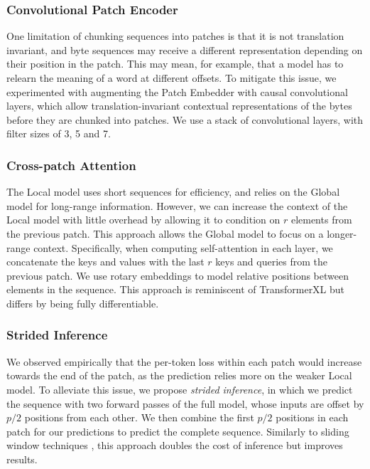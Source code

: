 \documentclass{article}
\theoremstyle{plain}
\theoremstyle{definition}
\theoremstyle{remark}
\begin{document}
\subsubsection{Convolutional Patch Encoder}

One limitation of chunking sequences into patches is that it is not translation invariant, and byte sequences may receive a different representation depending on their position in the patch. This may mean, for example, that a model has to relearn the meaning of a word at different offsets. To mitigate this issue, we experimented with augmenting the Patch Embedder with causal convolutional layers, which allow translation-invariant contextual representations of the bytes before they are chunked into patches. We use a stack of convolutional layers, with filter sizes of 3, 5 and 7. %

\subsubsection{Cross-patch Attention}
The Local model uses short sequences for efficiency, and relies on the Global model for long-range information. However, we can increase the context of the Local model with little overhead by allowing it to condition on $r$ elements from the previous patch. This approach allows the Global model to focus on a longer-range context. Specifically, when computing self-attention in each layer, we concatenate the keys and values with the last $r$ keys and queries from the previous patch. We use rotary embeddings \citep{rotary} to model relative positions between elements in the sequence. This approach is reminiscent of TransformerXL \citep{xfmxl} but differs by being fully differentiable. 

\subsubsection{Strided Inference}
\label{strided}
We observed empirically that the per-token loss within each patch would increase towards the end of the patch, as the prediction relies more on the weaker Local model. To alleviate this issue, we propose \emph{strided inference}, in which we predict the sequence with two forward passes of the full model, whose inputs are offset by $p/2$ positions from each other. We then combine the first $p/2$ positions in each patch for our predictions to predict the complete sequence. Similarly to sliding window techniques \citep{shortformer}, this approach doubles the cost of inference but improves results.
\end{document}
